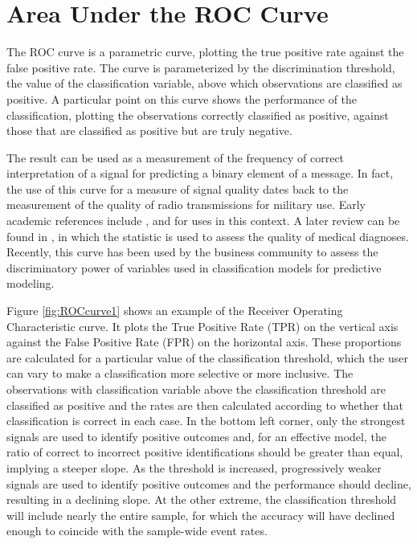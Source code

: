 

\section{Area Under the ROC Curve} \label{app:auroc}


The ROC curve is a parametric curve, plotting the true positive rate against the false positive rate.
The curve is parameterized by the discrimination threshold, the value of the classification variable, above which observations are classified as positive.
A particular point on this curve shows the performance of the classification, plotting the observations correctly classified as positive, against those that are classified as positive but are truly negative.

The result can be used as a measurement of the frequency of correct interpretation of a signal for predicting a binary element of a message.
In fact, the use of this curve for a measure of signal quality dates back to
the measurement of
the quality of radio transmissions for military use.
Early academic references include \citet{peterson1954}, \citet{vanmeter1954} and \citet{wald1949} for uses in this context.
A later review can be found in \citet{hanley1989}, in which the statistic is used to assess the quality of medical diagnoses.
Recently, this curve has been used by the business community to assess the discriminatory power of variables used in classification models for predictive modeling.

Figure \ref{fig:ROCcurve1} shows an example of the Receiver Operating Characteristic curve.
It plots the True Positive Rate (TPR) on the vertical axis against the False Positive Rate (FPR) on the horizontal axis.
These proportions are calculated for a particular value of the classification threshold, which the user can vary to make a classification more selective or more inclusive.
The observations with classification variable above the classification threshold are classified as positive and the rates are then calculated according to whether that classification is correct in each case.
In the bottom left corner, only the strongest signals are used to identify positive outcomes and, for an effective model, the ratio of correct to incorrect positive identifications should be greater than equal, implying a steeper slope.
As the threshold is increased, progressively weaker signals are used to identify positive outcomes and the performance should decline, resulting in a declining slope.
At the other extreme, the classification threshold will include nearly the entire sample, for which the accuracy will have declined enough to coincide with the sample-wide event rates.

